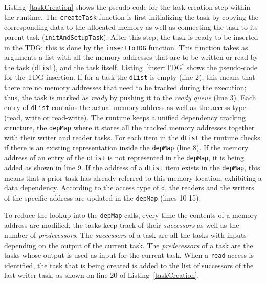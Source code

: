 Listing~\ref{taskCreation} shows the pseudo-code for the task creation step within the runtime.
The \texttt{createTask} function is first initializing the task by copying the corresponding data to the allocated memory as well as connecting the task to its parent task (\texttt{initAndSetupTask}).
After this step, the task is ready to be inserted in the TDG; this is done by the \texttt{insertToTDG} function.
This function takes as arguments a list with all the memory addresses that are to be written or read by the task (\texttt{dList}), and the task itself.
Listing~\ref{insertTDG} shows the pseudo-code for the TDG insertion. 
If for a task the \texttt{dList} is empty (line 2), this means that there are no memory addresses that need to be tracked during the execution; thus, the task is marked as \textit{ready} by pushing it to the \textit{ready queue} (line 3).
Each entry of \texttt{dList} contains the actual memory address as well as the access type (read, write or read-write).
The runtime keeps a unified dependency tracking structure, the \texttt{depMap} where it stores all the tracked memory addresses together with their writer and reader tasks.
For each item in the \texttt{dList} the runtime checks if there is an existing representation inside the \texttt{depMap} (line 8).
If the memory address of an entry of the \texttt{dList} is not represented in the \texttt{depMap}, it is being added as shown in line 9.
If the address of a \texttt{dList} item exists in the \texttt{depMap}, this means that a prior task has already referred to this memory location, exhibiting a data dependency.
According to the access type of \texttt{d}, the readers and the writers of the specific address are updated in the \texttt{depMap} (lines 10-15).

To reduce the lookup into the \texttt{depMap} calls, every time the contents of a memory address are modified, the tasks keep track of their \textit{successors} as well as the number of \textit{predecessors}.
The \textit{successors} of a task are all the tasks with inputs depending on the output of the current task.
The \textit{predecessors} of a task are the tasks whose output is used as input for the current task.
When a \texttt{read} access is identified, the task that is being created is added to the list of successors of the last writer task, as shown on line 20 of Listing~\ref{taskCreation}.

